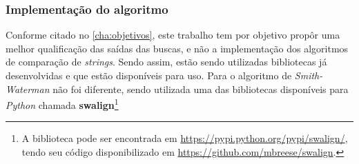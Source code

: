 \subsubsection{Implementação do algoritmo} %
\label{sub:implementa_o_do_algoritmo}

Conforme citado no \autoref{cha:objetivos}, este trabalho tem por objetivo propôr uma melhor qualificação das saídas das buscas, e não a implementação dos algoritmos de comparação de \textit{strings}. Sendo assim, estão sendo utilizadas bibliotecas já desenvolvidas e que estão  disponíveis para uso. Para o algoritmo de \textit{Smith-Waterman} não foi diferente, sendo utilizada uma das bibliotecas disponíveis para \textit{Python} chamada \textbf{swalign}\footnote{A biblioteca pode ser encontrada em \url{https://pypi.python.org/pypi/swalign/}, tendo seu código disponibilizado em \url{https://github.com/mbreese/swalign}.}

